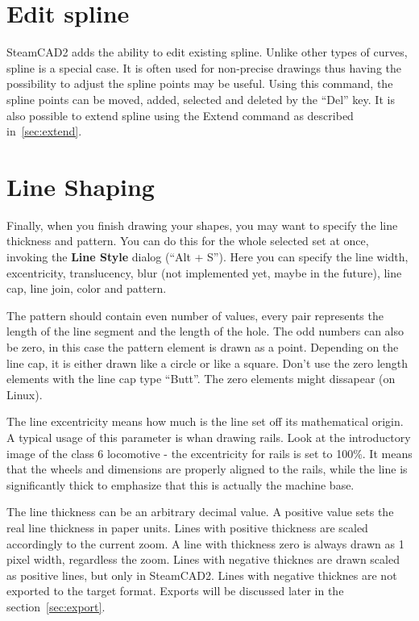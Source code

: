 \section{Edit spline}

SteamCAD2 adds the ability to edit existing spline. Unlike other types of curves, spline
is a special case. It is often used for non-precise drawings thus having the possibility
to adjust the spline points may be useful. Using this command, the spline points can be moved,
added, selected and deleted by the ``Del'' key. It is also possible to extend spline using
the Extend command as described in~\ref{sec:extend}.

\section{Line Shaping}

Finally, when you finish drawing your shapes, you may want to specify the line
thickness and pattern. You can do this for the whole selected set at once, invoking
the \textbf{Line Style} dialog (``Alt + S''). Here you can specify the line width,
excentricity, translucency, blur (not implemented yet, maybe in the future), line
cap, line join, color and pattern.

The pattern should contain even number of values, every pair represents the length
of the line segment and the length of the hole. The odd numbers can also be zero,
in this case the pattern element is drawn as a point. Depending on the line cap,
it is either drawn like a circle or like a square. Don't use the zero length elements
with the line cap type ``Butt''. The zero elements might dissapear (on Linux).

The line excentricity means how much is the line set off its mathematical origin.
A typical usage of this parameter is whan drawing rails. Look at the introductory
image of the class 6 locomotive - the excentricity for rails is set to 100\%.
It means that the wheels and dimensions are properly aligned to the rails, while
the line is significantly thick to emphasize that this is actually the machine
base.

The line thickness can be an arbitrary decimal value. A positive value sets the
real line thickness in paper units. Lines with positive thickness are scaled
accordingly to the current zoom. A line with thickness zero is always drawn
as 1 pixel width, regardless the zoom. Lines with negative thicknes are drawn
scaled as positive lines, but only in SteamCAD2. Lines with negative
thicknes are not exported to the target format. Exports will be discussed later
in the section~\ref{sec:export}.


